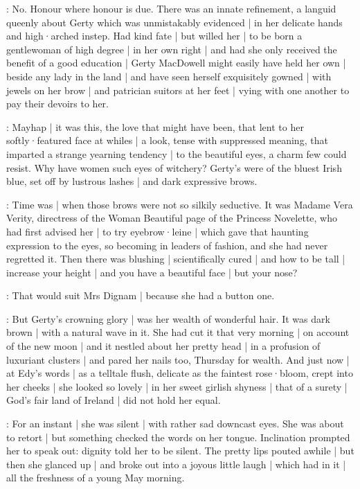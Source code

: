 \gertyNovel:
No.
Honour where honour is due.
There was an innate refinement,
a languid queenly  about Gerty
which was unmistakably evidenced |
in her delicate hands
and high·arched instep.
Had kind fate |
but willed her |
to be born a gentlewoman of high degree |
in her own right |%
and had she only received the benefit of a good education |
Gerty MacDowell might easily have held her own |
beside any lady in the land |
and have seen herself exquisitely gowned |
with jewels on her brow |
and patrician suitors at her feet |
vying with one another to pay their devoirs to her.

\gertyRomantic:
Mayhap |
it was this,
the love that might have been,
that lent to her softly·featured face at whiles |
a look,
tense with suppressed meaning,
that imparted a strange yearning tendency |
to the beautiful eyes,
a charm few could resist.
Why have women such eyes of witchery?
Gerty's were of the bluest Irish blue,
set off by lustrous lashes |
and dark expressive brows.

\gertyReal:
Time was |
when those brows were not so silkily seductive.
It was Madame Vera Verity,%
directress of the Woman Beautiful page of the Princess Novelette,
who had first advised her |
to try eyebrow·leine |
which gave that haunting expression to the eyes,
so becoming in leaders of fashion,
and she had never regretted it.
Then there was blushing |
scientifically cured |
and how to be tall |
increase your height |
and you have a beautiful face |
but your nose?

\gertyJudgy:
That would suit Mrs Dignam |
because she had a button one.

\gertyNovel:
But Gerty's crowning glory |
was her wealth of wonderful hair.
It was dark brown |
with a natural wave in it.
She had cut it that very morning |
on account of the new moon |
and it nestled about her pretty head |
in a profusion of luxuriant clusters |
and pared her nails too,
Thursday for wealth.
And just now |
at Edy's words |
as a telltale flush,%
delicate as the faintest rose·bloom,
crept into her cheeks |
she looked so lovely |
in her sweet girlish shyness |
that of a surety |
God's fair land of Ireland |
did not hold her equal.

\Nnovel:
For an instant |
she was silent |
with rather sad downcast eyes.
She was about to retort |
but something checked the words on her tongue.
Inclination prompted her to speak out:
dignity told her to be silent.
The pretty lips pouted awhile |
but then she glanced up |
and broke out into a joyous little laugh |
which had in it |
all the freshness
of a young May morning.

